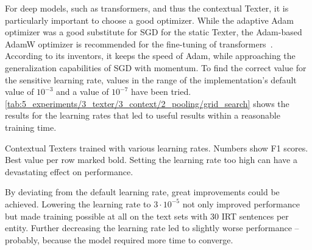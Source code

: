 For deep models, such as transformers, and thus the contextual Texter, it is particularly important to choose a good optimizer. While the adaptive Adam optimizer was a good substitute for SGD for the static Texter, the Adam-based AdamW optimizer is recommended for the fine-tuning of transformers~\cite{Loshchilov2019DecoupledWD}. According to its inventors, it keeps the speed of Adam, while approaching the generalization capabilities of SGD with momentum. To find the correct value for the sensitive learning rate, values in the range of the implementation's default value of $10^{-3}$ and a value of $10^{-7}$ have been tried. \autoref{tab:5_experiments/3_texter/3_context/2_pooling/grid_search} shows the results for the learning rates that led to useful results within a reasonable training time.

\begin{table}[h]
    \centering
    
    \caption{Contextual Texters trained with various learning rates. Numbers show F1 scores. Best value per row marked bold. Setting the learning rate too high can have a devastating effect on performance.}
    \label{tab:5_experiments/3_texter/3_context/3_optimizer/grid_search}
\end{table}

By deviating from the default learning rate, great improvements could be achieved. Lowering the learning rate to $3 \cdot 10^{-5}$ not only improved performance but made training possible at all on the text sets with 30 IRT sentences per entity. Further decreasing the learning rate led to slightly worse performance -- probably, because the model required more time to converge.

